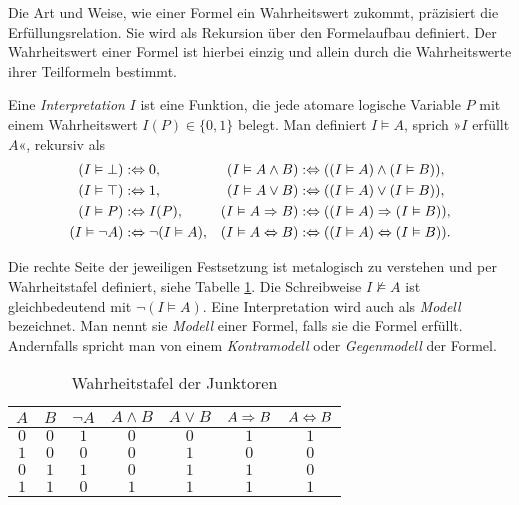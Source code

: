Die Art und Weise, wie einer Formel ein Wahrheitswert zukommt,
präzisiert die Erfüllungsrelation. Sie wird als Rekursion über den
Formelaufbau definiert. Der Wahrheitswert einer Formel ist hierbei
einzig und allein durch die Wahrheitswerte ihrer Teilformeln bestimmt.

\begin{Definition}[Erfüllungsrelation]\label{def:sat}\newlinefirst
Eine \emph{Interpretation} $I$ ist eine Funktion, die jede atomare
logische Variable $P$ mit einem Wahrheitswert $I(P)\in\{0,1\}$ belegt.
Man definiert $I\models A$, sprich »$I$ erfüllt $A$«, rekursiv als
\begin{align*}
(I\vDash\bot) &:\Leftrightarrow 0,
& (I\vDash A\land B) &:\Leftrightarrow ((I\vDash A)\land (I\vDash B)),\\
(I\vDash\top) &:\Leftrightarrow 1,
& (I\vDash A\lor B) &:\Leftrightarrow ((I\vDash A)\lor (I\vDash B)),\\
(I\vDash P) &:\Leftrightarrow I(P),
& (I\vDash A\Rightarrow B) &:\Leftrightarrow ((I\vDash A)\Rightarrow (I\vDash B)),\\
(I\vDash\lnot A) &:\Leftrightarrow \lnot (I\vDash A),
& (I\vDash A\Leftrightarrow B) &:\Leftrightarrow ((I\vDash A)\Leftrightarrow (I\vDash B)).
\end{align*}
\end{Definition}
Die rechte Seite der jeweiligen Festsetzung ist metalogisch zu verstehen
und per Wahrheitstafel definiert, siehe Tabelle \ref{tab:Junktoren}.
Die Schreibweise $I\nvDash A$ ist gleichbedeutend mit
$\lnot (I\models A)$. Eine Interpretation wird auch als \emph{Modell}
bezeichnet. Man nennt sie \emph{Modell} einer Formel, falls sie die
Formel erfüllt. Andernfalls spricht man von einem \emph{Kontramodell}
oder \emph{Gegenmodell} der Formel.

\begin{table}
\caption{Wahrheitstafel der Junktoren}
\label{tab:Junktoren}
\centering
\begin{tabular}{cc@{\qquad}c@{\qquad}c@{\qquad}c@{\qquad}c@{\qquad}c}
\toprule
$A$ & $B$ & $\lnot A$ & $A\land B$ & $A\lor B$ & $A\Rightarrow B$ & $A\Leftrightarrow B$\\
\midrule[\heavyrulewidth]
$0$ & $0$ & $1$ & $0$ & $0$ & $1$ & $1$\\
$1$ & $0$ & $0$ & $0$ & $1$ & $0$ & $0$\\
$0$ & $1$ & $1$ & $0$ & $1$ & $1$ & $0$\\
$1$ & $1$ & $0$ & $1$ & $1$ & $1$ & $1$\\
\bottomrule
\end{tabular}
\end{table}

